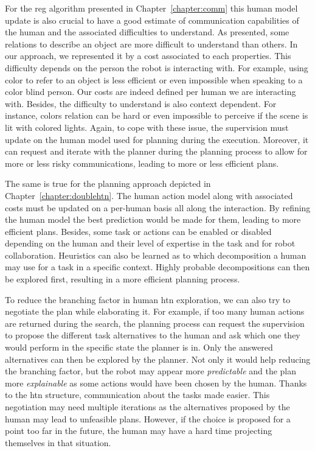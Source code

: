 \documentclass[a4paper,11pt,twoside]{StyleThese}
\begin{document}
For the \acrshort{reg} algorithm presented in Chapter~\ref{chapter:comm} this human model update is also crucial to have a good estimate of communication capabilities of the human and the associated difficulties to understand. As presented, some relations to describe an object are more difficult to understand than others. In our approach, we represented it by a cost associated to each properties. This difficulty depends on the person the robot is interacting with. For example, using color to refer to an object is less efficient or even impossible when speaking to a color blind person. Our costs are indeed defined per human we are interacting with. Besides, the difficulty to understand is also context dependent. For instance, colors relation can be hard or even impossible to perceive if the scene is lit with colored lights. Again, to cope with these issue, the supervision must update on the human model used for planning during the execution. Moreover, it can request and iterate with the planner during the planning process to allow for more or less risky communications, leading to more or less efficient plans.

The same is true for the planning approach depicted in Chapter~\ref{chapter:doublehtn}. The human action model along with associated costs must be updated on a per-human basis all along the interaction. By refining the human model the best prediction would be made for them, leading to more efficient plans. Besides, some task or actions can be enabled or disabled depending on the human and their level of expertise in the task and for robot collaboration. Heuristics can also be learned as to which decomposition a human may use for a task in a specific context. Highly probable decompositions can then be explored first, resulting in a more efficient planning process.

To reduce the branching factor in human \acrshort{htn} exploration, we can also try to negotiate the plan while elaborating it. For example, if too many human actions are returned during the search, the planning process can request the supervision to propose the different task alternatives to the human and ask which one they would perform in the specific state the planner is in. Only the answered alternatives can then be explored by the planner. Not only it would help reducing the branching factor, but the robot may appear more \textit{predictable} and the plan more \textit{explainable} as some actions would have been chosen by the human. Thanks to the \acrshort{htn} structure, communication about the tasks made easier. This negotiation may need multiple iterations as the alternatives proposed by the human may lead to unfeasible plans. However, if the choice is proposed for a point too far in the future, the human may have a hard time projecting themselves in that situation.
\end{document}
